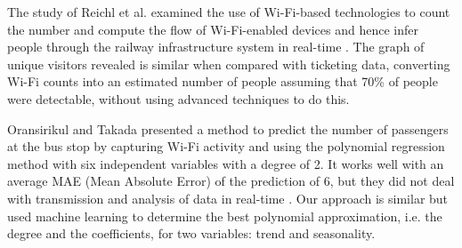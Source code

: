 The study of Reichl et al. examined the use of Wi-Fi-based technologies to count the number and compute the flow of Wi-Fi-enabled devices and hence infer people through the railway infrastructure system in real-time \cite{reichl2018using}. The graph of unique visitors revealed is similar when compared with ticketing data, converting Wi-Fi counts into an estimated number of people assuming that 70\% of people were detectable, without using advanced techniques to do this.

Oransirikul and Takada presented a method to predict the number of passengers at the bus stop by capturing Wi-Fi activity and using the polynomial regression method with six independent variables with a degree of 2. It works well with an average MAE (Mean Absolute Error) of the prediction of 6, but they did not deal with transmission and analysis of data in real-time \cite{oransirikul2019practicability}.
Our approach is similar but used machine learning to determine the best polynomial approximation, i.e. the degree and the coefficients, for two variables: trend and seasonality.
